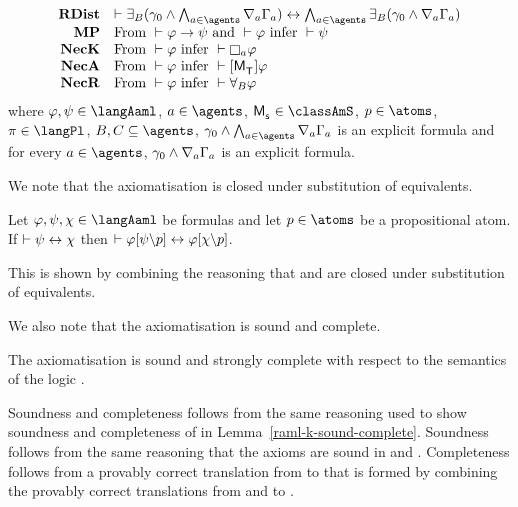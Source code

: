 \begin{definition}
$$\begin{array}{rl}
    {\bf RDist} & \proves \somerefsBs (\gamma_0 \land \bigwedge_{\agentA \in \agents} \coversA \Gamma_\agentA) \iff \bigwedge_{\agentA \in \agents} \somerefsBs (\gamma_0 \land \coversA \Gamma_\agentA)\\
    {\bf MP}    & \text{From } \proves \phi \implies \psi \text{ and } \proves \phi \text{ infer } \proves \psi\\
    {\bf NecK}  & \text{From } \proves \phi \text{ infer } \proves \necessaryA \phi\\
    {\bf NecA} & \text{From } \proves \phi \text{ infer } \proves \actionA{\aPModel{\aStatesT}} \phi\\
    {\bf NecR} & \text{From } \proves \phi \text{ infer } \proves \allrefsBs \phi
\end{array}
$$
where $\phi, \psi \in \langAaml$, $\agentA \in \agents$, $\aPModel{\aStateS} \in \classAmS$, $\atomP \in \atoms$, $\pi \in \langPl$, $\agentsB, \agentsC \subseteq \agents$, $\gamma_0 \land \bigwedge_{\agentA \in \agents} \coversA \Gamma_\agentA$ is an explicit formula and for every $\agentA \in \agents$, $\gamma_0 \land \nabla_{a} \Gamma_a$ is an explicit formula.
\end{definition}

We note that the axiomatisation \axiomRamlS{} is closed under substitution of equivalents.

\begin{lemma}
Let $\phi, \psi, \chi \in \langAaml$ be formulas and let $\atomP \in \atoms$ be a propositional atom.
If $\vdash \psi \leftrightarrow \chi$ then $\vdash \varphi[\psi\backslash p] \leftrightarrow \varphi[\chi\backslash p]$.
\end{lemma}

This is shown by combining the reasoning that \axiomAmlS{} and \axiomRmlS{} are closed under substitution of equivalents.

We also note that the axiomatisation \axiomRamlS{} is sound and complete.

\begin{lemma}\label{raml-s5-sound-complete}
The axiomatisation \axiomRamlS{} is sound and strongly complete with respect to the semantics of the logic \logicRamlS{}.
\end{lemma}

Soundness and completeness follows from the same reasoning used to show soundness and completeness of \axiomRamlK{} in Lemma~\ref{raml-k-sound-complete}.
Soundness follows from the same reasoning that the axioms are sound in \logicAmlS{} and \logicRmlS{}.
Completeness follows from a provably correct translation from \langAaml{} to \langMl{} that is formed by combining the provably correct translations from \langAml{} and \langRml{} to \langMl{}.

